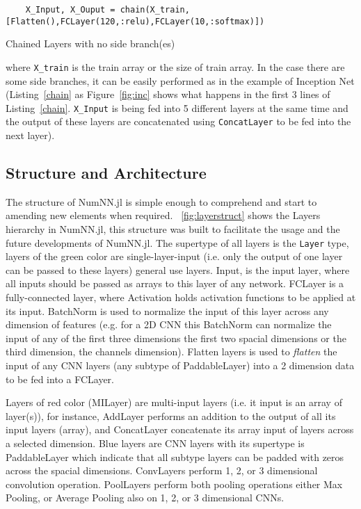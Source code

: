 \begin{listing}[H]
	\begin{verbatim}
	X_Input, X_Ouput = chain(X_train,[Flatten(),FCLayer(120,:relu),FCLayer(10,:softmax)])
	\end{verbatim}
	\caption{Chained Layers with no side branch(es)}\label{chain}
\end{listing}


where \texttt{X_train} is the train array or the size of train array. In the case there are some side branches, it can be easily performed as in the example of Inception Net \cite{Szegedy2016} (Listing~\ref{chain} as Figure~\ref{fig:inc} shows what happens in the first 3 lines of Listing~\ref{chain}. \texttt{X_Input} is being fed into 5 different layers at the same time and the output of these layers are concatenated using \texttt{ConcatLayer} to be fed into the next layer). 


\subsection{Structure and Architecture}\label{subsec:saa}

The structure of NumNN.jl is simple enough to comprehend and start to amending new elements when required. \figurename~\ref{fig:layerstruct} shows the Layers hierarchy in NumNN.jl, this structure was built to facilitate the usage and the future developments of NumNN.jl. The supertype of all layers is the \texttt{Layer} type, layers of the green color are single-layer-input (i.e. only the output of one layer can be passed to these layers) general use layers. Input, is the input layer, where all inputs should be passed as arrays to this layer of any network. FCLayer is a fully-connected layer, where Activation holds activation functions to be applied at its input. BatchNorm is used to normalize the input of this layer across any dimension of features (e.g. for a 2D CNN this BatchNorm can normalize the input of any of the first three dimensions the first two spacial dimensions or the third dimension, the channels dimension). Flatten layers is used to \emph{flatten} the input of any CNN layers (any subtype of PaddableLayer) into a 2 dimension data to be fed into a FCLayer.

Layers of red color (MILayer) are multi-input layers (i.e. it input is an array of layer(s)), for instance, AddLayer performs an addition to the output of all its input layers (array), and ConcatLayer concatenate its array input of layers across a selected dimension. Blue layers are CNN layers with its supertype is PaddableLayer which indicate that all subtype layers can be padded with zeros across the spacial dimensions. ConvLayers perform 1, 2, or 3 dimensional convolution operation. PoolLayers perform both pooling operations either Max Pooling, or Average Pooling also on 1, 2, or 3 dimensional CNNs.

